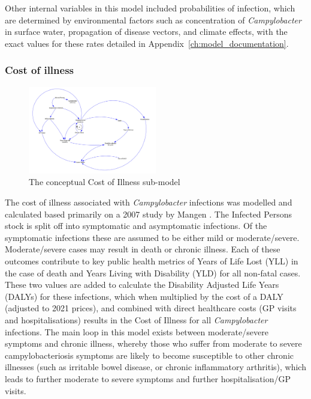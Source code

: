 Other internal variables in this model included probabilities of infection, which are determined by environmental factors such as concentration of \textit{Campylobacter} in surface water, propagation of disease vectors, and climate effects, with the exact values for these rates detailed in Appendix~\ref{ch:model_documentation}.


\subsubsection*{Cost of illness}
\begin{figure}[h]
\centering
\includegraphics[width=0.5\textwidth]{images/COI_submodel.png}
\caption{The conceptual Cost of Illness sub-model}
\end{figure}
The cost of illness associated with \textit{Campylobacter} infections was modelled and calculated based primarily on a 2007 study by Mangen \parencite{mangen_campylobacteriosis_2007}. The Infected Persons stock is split off into symptomatic and asymptomatic infections. Of the symptomatic infections these are assumed to be either mild or moderate/severe. Moderate/severe cases may result in death or chronic illness. Each of these outcomes contribute to key public health metrics of Years of Life Lost (YLL) in the case of death and Years Living with Disability (YLD) for all non-fatal cases. These two values are added to calculate the Disability Adjusted Life Years (DALYs) for these infections, which when multiplied by the cost of a DALY (adjusted to 2021 prices), and combined with direct healthcare costs (GP visits and hospitalisations) results in the Cost of Illness for all \textit{Campylobacter} infections. The main loop in this model exists between moderate/severe symptoms and chronic illness, whereby those who suffer from moderate to severe campylobacteriosis symptoms are likely to become susceptible to other chronic illnesses (such as irritable bowel disease, or chronic inflammatory arthritis), which leads to further moderate to severe symptoms and further hospitalisation/GP visits.


